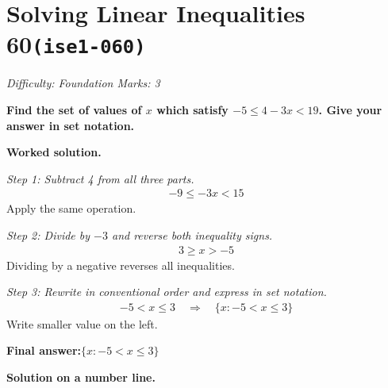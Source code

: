 \documentclass[11pt]{article}
\newcommand{\question}[1]{\par\medskip\noindent\textbf{#1}\par}
\begin{document}
\section*{Solving Linear Inequalities 60\quad\small\texttt{(ise1-060)}}
\textit{Difficulty: Foundation \quad\textbar\quad Marks: 3}

\question{Find the set of values of \( x \) which satisfy \( -5 \leq 4 - 3x < 19 \). Give your answer in set notation.}

\textbf{Worked solution.}

\textit{Step 1: Subtract 4 from all three parts.}
\[\begin{gathered}
-9 \leq -3x < 15
\end{gathered}\]
Apply the same operation.

\textit{Step 2: Divide by \( -3 \) and reverse both inequality signs.}
\[\begin{gathered}
3 \geq x > -5
\end{gathered}\]
Dividing by a negative reverses all inequalities.

\textit{Step 3: Rewrite in conventional order and express in set notation.}
\[\begin{gathered}
-5 < x \leq 3 \quad \Rightarrow \quad \{x : -5 < x \leq 3\}
\end{gathered}\]
Write smaller value on the left.

\begin{answerbox}
\textbf{Final answer:}\quad \(\displaystyle  \{x : -5 < x \leq 3\} \)
\end{answerbox}
\textbf{Solution on a number line.}
\end{document}
